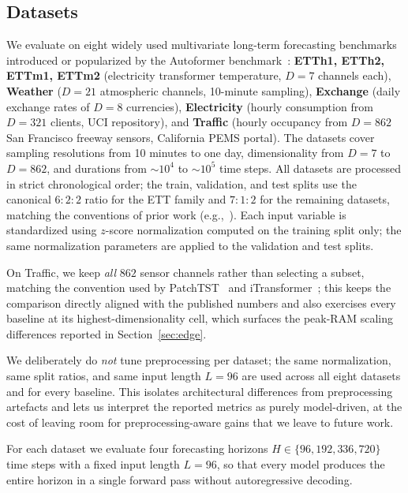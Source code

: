 \documentclass[journal]{IEEEtran}
\theoremstyle{remark}
\begin{document}
\subsection{Datasets}
\label{subsec:datasets}
We evaluate on eight widely used multivariate long-term forecasting
benchmarks introduced or popularized by the Autoformer
benchmark~\cite{Wu2021Autoformer}:
\textbf{ETTh1, ETTh2, ETTm1, ETTm2} (electricity transformer
temperature, $D{=}7$ channels each), \textbf{Weather}
($D{=}21$ atmospheric channels, 10-minute sampling),
\textbf{Exchange} (daily exchange rates of $D{=}8$ currencies),
\textbf{Electricity} (hourly consumption from $D{=}321$ clients,
UCI repository), and \textbf{Traffic} (hourly occupancy from
$D{=}862$ San Francisco freeway sensors, California PEMS portal).
The datasets cover sampling resolutions from 10 minutes to one day,
dimensionality from $D{=}7$ to $D{=}862$, and durations from
$\sim$$10^{4}$ to $\sim$$10^{5}$ time steps. All datasets are
processed in strict chronological order; the train, validation, and
test splits use the canonical $6{:}2{:}2$ ratio for the ETT family
and $7{:}1{:}2$ for the remaining datasets, matching the conventions
of prior work
(e.g.,~\cite{Wu2021Autoformer,Nie2023PatchTST,Liu2024iTransformer}).
Each input variable is standardized using $z$-score normalization
computed on the training split only; the same normalization
parameters are applied to the validation and test splits.

On Traffic, we keep \emph{all} $862$ sensor channels rather than
selecting a subset, matching the convention used by
PatchTST~\cite{Nie2023PatchTST} and
iTransformer~\cite{Liu2024iTransformer}; this keeps the comparison
directly aligned with the published numbers and also exercises every
baseline at its highest-dimensionality cell, which surfaces the
peak-RAM scaling differences reported in Section~\ref{sec:edge}.

We deliberately do \emph{not} tune preprocessing per dataset; the
same normalization, same split ratios, and same input length
$L{=}96$ are used across all eight datasets and for every baseline.
This isolates architectural differences from preprocessing
artefacts and lets us interpret the reported metrics as purely
model-driven, at the cost of leaving room for preprocessing-aware
gains that we leave to future work.

For each dataset we evaluate four forecasting horizons
$H \in \{96, 192, 336, 720\}$ time steps with a fixed input length
$L = 96$, so that every model produces the entire horizon in a
single forward pass without autoregressive decoding.
\end{document}
